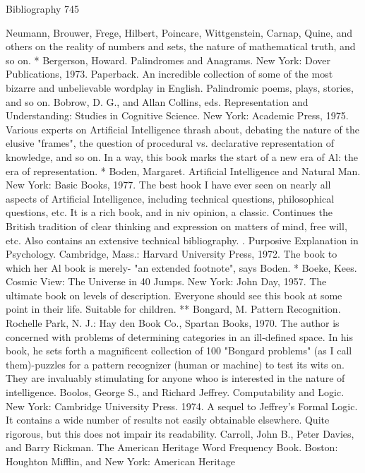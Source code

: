 Bibliography                                                                            745

  Neumann, Brouwer, Frege, Hilbert, Poincare, Wittgenstein, Carnap, Quine, and others
  on the reality of numbers and sets, the nature of mathematical truth, and so on.
* Bergerson, Howard. Palindromes and Anagrams. New York: Dover Publications, 1973.
  Paperback. An incredible collection of some of the most bizarre and unbelievable
  wordplay in English. Palindromic poems, plays, stories, and so on.
Bobrow, D. G., and Allan Collins, eds. Representation and Understanding: Studies in
  Cognitive Science. New York: Academic Press, 1975. Various experts on Artificial
  Intelligence thrash about, debating the nature of the elusive "frames", the question of
  procedural vs. declarative representation of knowledge, and so on. In a way, this book
  marks the start of a new era of Al: the era of representation.
* Boden, Margaret. Artificial Intelligence and Natural Man. New York: Basic Books,
  1977. The best hook I have ever seen on nearly all aspects of Artificial Intelligence,
  including technical questions, philosophical questions, etc. It is a rich book, and in niv
  opinion, a classic. Continues the British tradition of clear thinking and expression on
  matters of mind, free will, etc. Also contains an extensive technical bibliography.
. Purposive Explanation in Psychology. Cambridge, Mass.: Harvard University Press,
  1972. The book to which her Al book is merely- "an extended footnote", says Boden.
* Boeke, Kees. Cosmic View: The Universe in 40 Jumps. New York: John Day, 1957.
  The ultimate book on levels of description. Everyone should see this book at some
  point in their life. Suitable for children.
** Bongard, M. Pattern Recognition. Rochelle Park, N. J.: Hay den Book Co., Spartan
  Books, 1970. The author is concerned with problems of determining categories in an
  ill-defined space. In his book, he sets forth a magnificent collection of 100 "Bongard
  problems" (as I call them)-puzzles for a pattern recognizer (human or machine) to test
  its wits on. They are invaluably stimulating for anyone whoo is interested in the nature
  of intelligence.
Boolos, George S., and Richard Jeffrey. Computability and Logic. New York: Cambridge
  University Press. 1974. A sequel to Jeffrey's Formal Logic. It contains a wide number
  of results not easily obtainable elsewhere. Quite rigorous, but this does not impair its
  readability.
Carroll, John B., Peter Davies, and Barry Rickman. The American Heritage Word
  Frequency Book. Boston: Houghton Mifflin, and New York: American Heritage
